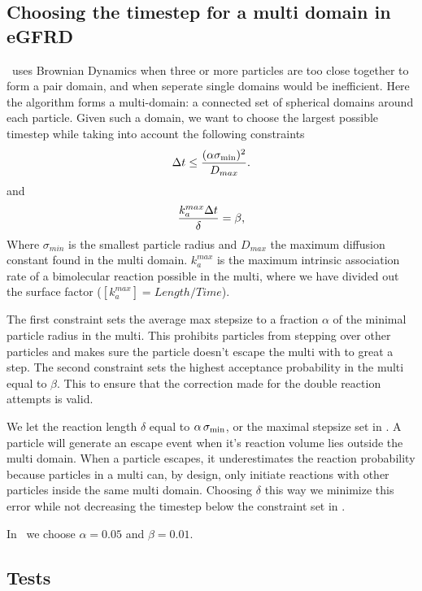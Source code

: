 \subsection{Choosing the timestep for a multi domain in eGFRD}

\GFRD\, uses Brownian Dynamics when three or more particles are too close together to form a pair domain, and when seperate single domains would be inefficient. Here the algorithm forms a multi-domain: a connected set of spherical domains around each particle. Given such a domain, we want to choose the largest possible timestep while taking into account the following constraints
\begin{equation}
 \Delta t \leq \frac{(\alpha \sigma_{\rm min})^2 }{D_{max}}.
 \elabel{BDcntrI}
\end{equation}
and
\begin{equation}
 \frac{k_{a}^{max} \Delta t}{\delta} = \beta,
 \elabel{BDcntrII}
\end{equation}
Where $\sigma_{min}$ is the smallest particle radius and $D_{max}$ the maximum diffusion constant found in the multi domain. $k_{a}^{max}$ is the maximum intrinsic association rate of a bimolecular reaction possible in the multi, where we have divided out the surface factor ($[k_{a}^{max}] = Length/Time $).

The first constraint sets the average max stepsize to a fraction $\alpha$ of the minimal particle radius in the multi. This prohibits particles from stepping over other particles and makes sure the particle doesn't escape the multi with to great a step. The second constraint sets the highest acceptance probability in the multi equal to $\beta$. This to ensure that the correction made for the double reaction attempts is valid. 

We let the reaction length $\delta$ equal to $\alpha \, \sigma_{\rm min}$, or the maximal stepsize set in . A particle will generate an escape event when it's reaction volume lies outside the multi domain. When a particle escapes, it underestimates the reaction probability because particles in a multi can, by design, only initiate reactions with other particles inside the same multi domain. Choosing $\delta$ this way we minimize this error while not decreasing the timestep below the constraint set in .

In \GFRD\, we choose $\alpha = 0.05$ and $\beta = 0.01$.



\subsection{Tests}

